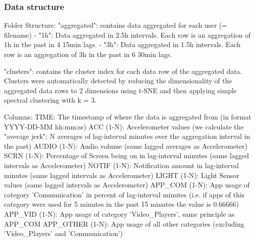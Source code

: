 


\subsubsection{Data structure}
Folder Structure:
	"aggregated": contains data aggregated for each user (= filename)
		- "1h": Data aggregated in 2.5h intervals. Each row is an aggregation of 1h in the past in 4 15min lags.
		- "3h": Data aggregated in 1.5h intervals. Each row is an aggregation of 3h in the past in 6 30min lags.

	"clusters": contains the cluster index for each data row of the aggregated data. Clusters were automatically detected by reducing the dimensionality of the aggregated data rows to 2 dimensions using t-SNE and then applying simple spectral clustering with k = 3.

Columns:
	TIME: 			The timestamp of where the data is aggregated from (in format YYYY-DD-MM hh:mm:ss)
	ACC (1-N): 		Accelerometer values (we calculate the "average jerk"; N averages of lag-interval minutes over the aggregation interval in the past)
	AUDIO (1-N): 		Audio volume (same lagged averages as Accelerometer)
	SCRN (1-N): 		Percentage of Screen being on in lag-interval minutes (same lagged intervals as Accelerometer)
	NOTIF (1-N): 		Notification amount in lag-interval minutes (same lagged intervals as Accelerometer)
	LIGHT (1-N): 		Light Sensor values (same lagged intervals as Accelerometer)
	APP_COM (1-N):		App usage of category 'Communication' in percent of lag-interval minutes (i.e. if apps of this category were used for 5 minutes in the past 15 minutes the value is 0.66666)
	APP_VID (1-N):		App usage of category 'Video_Players', same principle as APP_COM
	APP_OTHER (1-N):	App usage of all other categories (excluding 'Video_Players' and 'Communication')
